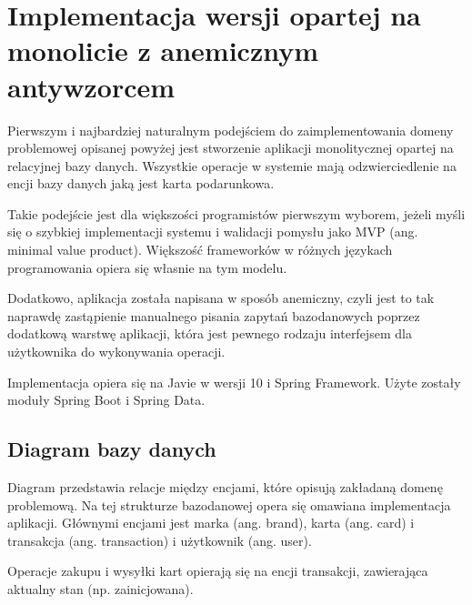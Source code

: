 \section{Implementacja wersji opartej na monolicie z anemicznym antywzorcem}
Pierwszym i najbardziej naturalnym podejściem do zaimplementowania domeny problemowej opisanej powyżej jest stworzenie aplikacji monolitycznej opartej na relacyjnej bazy danych. Wszystkie operacje w systemie mają odzwierciedlenie na encji bazy danych jaką jest karta podarunkowa. 

Takie podejście jest dla większości programistów pierwszym wyborem, jeżeli myśli się o szybkiej implementacji systemu i walidacji pomysłu jako MVP (ang. minimal value product). Większość frameworków w różnych językach programowania opiera się własnie na tym modelu. 

Dodatkowo, aplikacja została napisana w sposób anemiczny, czyli jest to tak naprawdę zastąpienie manualnego pisania zapytań bazodanowych poprzez dodatkową warstwę aplikacji, która jest pewnego rodzaju interfejsem dla użytkownika do wykonywania operacji.

Implementacja opiera się na Javie w wersji 10 i Spring Framework. Użyte zostały moduły Spring Boot i Spring Data.

\subsection{Diagram bazy danych}
Diagram przedstawia relacje między encjami, które opisują zakładaną domenę problemową. Na tej strukturze bazodanowej opera się omawiana implementacja aplikacji.
Głównymi encjami jest marka (ang. brand), karta (ang. card) i transakcja (ang. transaction) i użytkownik (ang. user).

Operacje zakupu i wysyłki kart opierają się na encji transakcji, zawierająca aktualny stan (np. zainicjowana).

